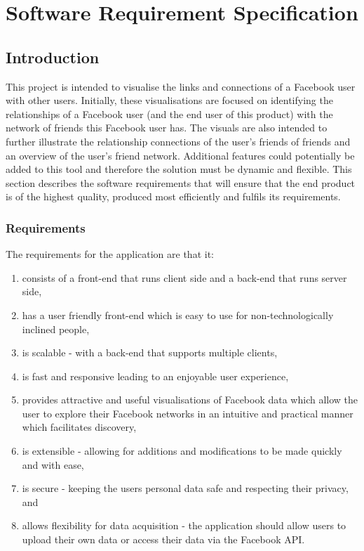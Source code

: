 \documentclass[12pt,onecolumn]{article}
\begin{document}
	\section{Software Requirement Specification} %
	
	\subsection{Introduction}
	This project is intended to visualise the links and connections of a Facebook user with other users. Initially, these visualisations are focused on identifying the relationships of a Facebook user (and the end user of this product) with the network of friends this Facebook user has. The visuals are also intended to further illustrate the relationship connections of the user's friends of friends and an overview of the user's friend network. Additional features could potentially be added to this tool and therefore the solution must be dynamic and flexible. This section describes the software requirements that will ensure that the end product is of the highest quality, produced most efficiently and fulfils its requirements.
	
	\subsubsection{Requirements}
	
	The requirements for the application are that it:
	\begin{enumerate}
		\item consists of a front-end that runs client side and a back-end that runs server side, 
		\item has a user friendly front-end which is easy to use for non-technologically inclined people,
		\item is scalable - with a back-end that supports multiple clients,
		\item is fast and responsive leading to an enjoyable user experience,
		\item provides attractive and useful visualisations of Facebook data which allow the user to explore their Facebook networks in an intuitive and practical manner which facilitates discovery,
		\item is extensible - allowing for additions and modifications to be made quickly and with ease,
		\item is secure - keeping the users personal data safe and respecting their privacy, and
		\item allows flexibility for data acquisition - the application should allow users to upload their own data or access their data via the Facebook API.
	\end{enumerate}
	
\end{document}
